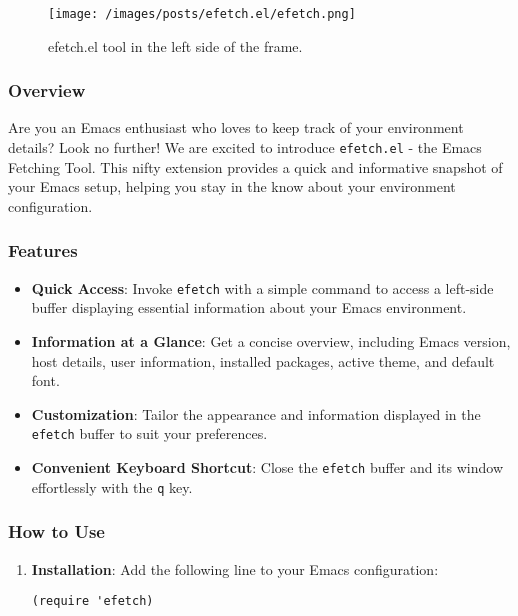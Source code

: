 \documentclass[11pt]{article}
\begin{document}
\begin{center}
\begin{figure}[htbp]
\centering
\texttt{[image: /images/posts/efetch.el/efetch.png]}
\caption{efetch.el tool in the left side of the frame.}
\end{figure}
\end{center}
\subsubsection{Overview}
\label{sec:orga8fe2f4}
Are you an Emacs enthusiast who loves to keep track of your environment details? Look no further! We are excited to introduce \texttt{efetch.el} - the Emacs Fetching Tool. This nifty extension provides a quick and informative snapshot of your Emacs setup, helping you stay in the know about your environment configuration.
\subsubsection{Features}
\label{sec:org3f14bf9}
\begin{itemize}
\item \textbf{\textbf{Quick Access}}: Invoke \texttt{efetch} with a simple command to access a left-side buffer displaying essential information about your Emacs environment.

\item \textbf{\textbf{Information at a Glance}}: Get a concise overview, including Emacs version, host details, user information, installed packages, active theme, and default font.

\item \textbf{\textbf{Customization}}: Tailor the appearance and information displayed in the \texttt{efetch} buffer to suit your preferences.

\item \textbf{\textbf{Convenient Keyboard Shortcut}}: Close the \texttt{efetch} buffer and its window effortlessly with the \texttt{q} key.
\end{itemize}
\subsubsection{How to Use}
\label{sec:org0d09656}
\begin{enumerate}
\item \textbf{\textbf{Installation}}: Add the following line to your Emacs configuration:

\begin{verbatim}
(require 'efetch)
\end{verbatim}
\end{enumerate}
\end{document}
